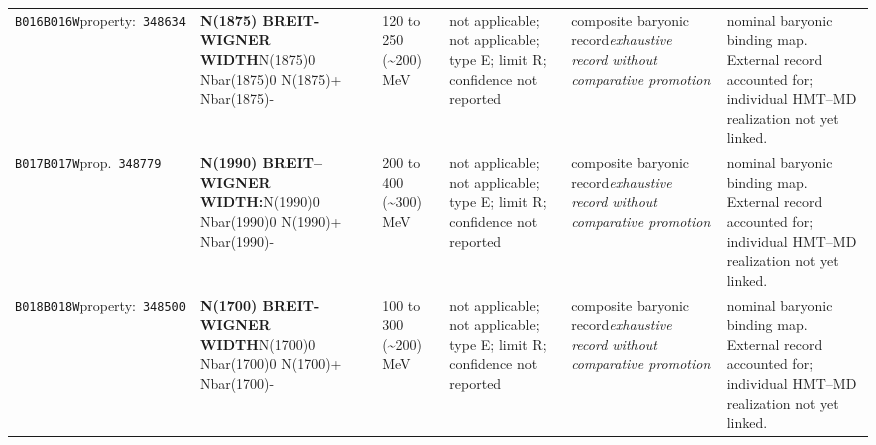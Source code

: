 \begin{landscape}
\begin{longtable}{L{1.85cm}L{4.45cm}L{2.35cm}L{4.05cm}L{3.35cm}L{7.15cm}}
\texttt{B016}\newline \texttt{B016W}\newline property:\ \texttt{348634} & \textbf{N(1875) BREIT-WIGNER WIDTH}\newline N(1875)0 \textbar{}\allowbreak{} Nbar(1875)0 \textbar{}\allowbreak{} N(1875)+ \textbar{}\allowbreak{} Nbar(1875)- & 120 to 250 (\textasciitilde{}200)\,MeV & not applicable; not applicable; type E; limit R; confidence not reported & composite baryonic record\newline \emph{exhaustive record without comparative promotion} & nominal baryonic binding map. External record accounted for; individual HMT--MD realization not yet linked. \\
\texttt{B017}\newline \texttt{B017W}\newline prop.\ \texttt{348779} & \textbf{N(1990) BREIT--WIGNER WIDTH:}\newline N(1990)0 \textbar{}\allowbreak{} Nbar(1990)0 \textbar{}\allowbreak{} N(1990)+ \textbar{}\allowbreak{} Nbar(1990)- & 200 to 400 (\textasciitilde{}300)\,MeV & not applicable; not applicable; type E; limit R; confidence not reported & composite baryonic record\newline \emph{exhaustive record without comparative promotion} & nominal baryonic binding map. External record accounted for; individual HMT--MD realization not yet linked. \\
\texttt{B018}\newline \texttt{B018W}\newline property:\ \texttt{348500} & \textbf{N(1700) BREIT-WIGNER WIDTH}\newline N(1700)0 \textbar{}\allowbreak{} Nbar(1700)0 \textbar{}\allowbreak{} N(1700)+ \textbar{}\allowbreak{} Nbar(1700)- & 100 to 300 (\textasciitilde{}200)\,MeV & not applicable; not applicable; type E; limit R; confidence not reported & composite baryonic record\newline \emph{exhaustive record without comparative promotion} & nominal baryonic binding map. External record accounted for; individual HMT--MD realization not yet linked. \\

\end{longtable}
\end{landscape}
